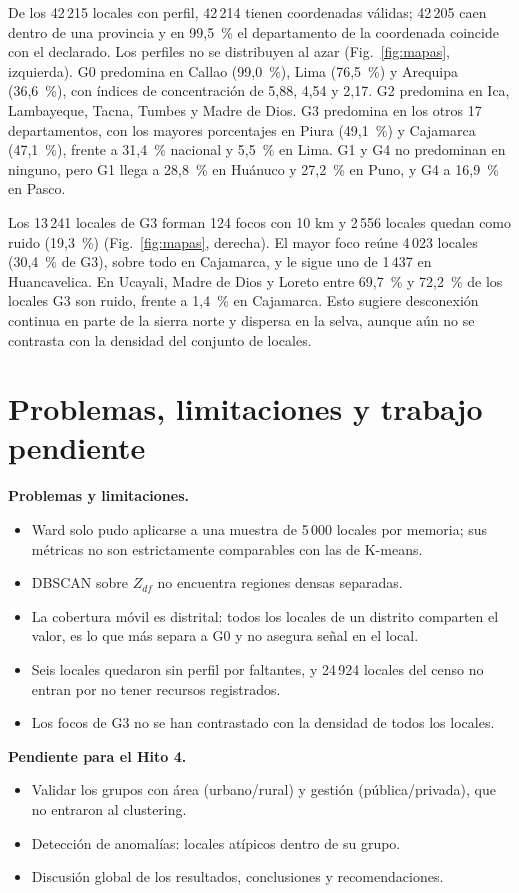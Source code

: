 \documentclass[conference]{IEEEtran}
\begin{document}
De los 42\,215 locales con perfil, 42\,214 tienen coordenadas válidas; 42\,205 caen dentro de una provincia y en 99,5~\% el departamento de la coordenada coincide con el declarado. Los perfiles no se distribuyen al azar (Fig.~\ref{fig:mapas}, izquierda). G0 predomina en Callao (99,0~\%), Lima (76,5~\%) y Arequipa (36,6~\%), con índices de concentración de 5,88, 4,54 y 2,17. G2 predomina en Ica, Lambayeque, Tacna, Tumbes y Madre de Dios. G3 predomina en los otros 17 departamentos, con los mayores porcentajes en Piura (49,1~\%) y Cajamarca (47,1~\%), frente a 31,4~\% nacional y 5,5~\% en Lima. G1 y G4 no predominan en ninguno, pero G1 llega a 28,8~\% en Huánuco y 27,2~\% en Puno, y G4 a 16,9~\% en Pasco.

Los 13\,241 locales de G3 forman 124 focos con 10 km y 2\,556 locales quedan como ruido (19,3~\%) (Fig.~\ref{fig:mapas}, derecha). El mayor foco reúne 4\,023 locales (30,4~\% de G3), sobre todo en Cajamarca, y le sigue uno de 1\,437 en Huancavelica. En Ucayali, Madre de Dios y Loreto entre 69,7~\% y 72,2~\% de los locales G3 son ruido, frente a 1,4~\% en Cajamarca. Esto sugiere desconexión continua en parte de la sierra norte y dispersa en la selva, aunque aún no se contrasta con la densidad del conjunto de locales.

\section{Problemas, limitaciones y trabajo pendiente}
\textbf{Problemas y limitaciones.}
\begin{itemize}
\item Ward solo pudo aplicarse a una muestra de 5\,000 locales por memoria; sus métricas no son estrictamente comparables con las de K-means.
\item DBSCAN sobre $Z_{df}$ no encuentra regiones densas separadas.
\item La cobertura móvil es distrital: todos los locales de un distrito comparten el valor, es lo que más separa a G0 y no asegura señal en el local.
\item Seis locales quedaron sin perfil por faltantes, y 24\,924 locales del censo no entran por no tener recursos registrados.
\item Los focos de G3 no se han contrastado con la densidad de todos los locales.
\end{itemize}

\textbf{Pendiente para el Hito 4.}
\begin{itemize}
\item Validar los grupos con área (urbano/rural) y gestión (pública/privada), que no entraron al clustering.
\item Detección de anomalías: locales atípicos dentro de su grupo.
\item Discusión global de los resultados, conclusiones y recomendaciones.
\end{itemize}
\end{document}
